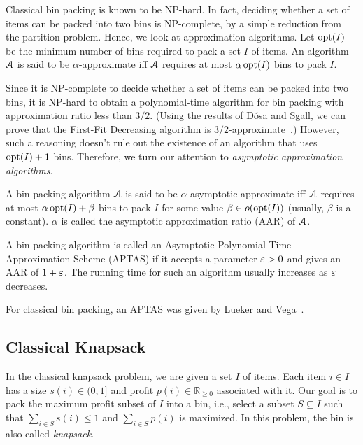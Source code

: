 Classical bin packing is known to be NP-hard.
In fact, deciding whether a set of items can be packed into two bins is NP-complete,
by a simple reduction from the partition problem.
Hence, we look at approximation algorithms.
Let $\operatorname{opt}(I)$ be the minimum number of bins required to pack a set $I$ of items.
An algorithm $\mathcal{A}$ is said to be $\alpha$-approximate iff
$\mathcal{A}$ requires at most $\alpha\operatorname{opt}(I)$ bins to pack $I$.

Since it is NP-complete to decide whether a set of items can be packed into two bins,
it is NP-hard to obtain a polynomial-time algorithm for bin packing
with approximation ratio less than $3/2$.
(Using the results of D\'osa and Sgall, we can prove that the First-Fit Decreasing algorithm
is $3/2$-approximate~\cite{dosa2013first,dosa2007tight}.)
However, such a reasoning doesn't rule out the existence of an algorithm
that uses $\operatorname{opt}(I) + 1$ bins.
Therefore, we turn our attention to \emph{asymptotic approximation algorithms}.
\begin{definition}
A bin packing algorithm $\mathcal{A}$ is said to be $\alpha$-asymptotic-approximate iff
$\mathcal{A}$ requires at most $\alpha\operatorname{opt}(I) + \beta$ bins to pack $I$
for some value $\beta \in o(\operatorname{opt}(I))$ (usually, $\beta$ is a constant).
$\alpha$ is called the asymptotic approximation ratio (AAR) of $\mathcal{A}$.
\end{definition}
\begin{definition}[APTAS]
A bin packing algorithm is called an Asymptotic Polynomial-Time Approximation Scheme (APTAS)
if it accepts a parameter $\varepsilon > 0$ and gives an AAR of $1+\varepsilon$.
The running time for such an algorithm usually increases as $\varepsilon$ decreases.
\end{definition}

For classical bin packing, an APTAS was given by Lueker and Vega~\cite{bp-aptas}.

\subsection{Classical Knapsack}

In the classical knapsack problem, we are given a set $I$ of items.
Each item $i \in I$ has a size $s(i) \in (0, 1]$
and profit $p(i) \in \mathbb{R}_{\ge 0}$ associated with it.
Our goal is to pack the maximum profit subset of $I$ into a bin,
i.e., select a subset $S \subseteq I$ such that
$\sum_{i \in S} s(i) \le 1$ and $\sum_{i \in S} p(i)$ is maximized.
In this problem, the bin is also called \emph{knapsack}.

